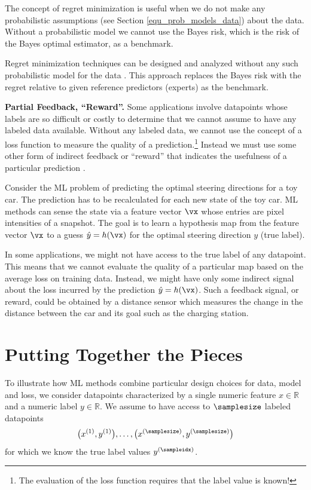 \documentclass[12pt]{report}
\begin{document}
The concept of regret minimization is useful when we do 
not make any probabilistic assumptions (see Section \ref{equ_prob_models_data}) 
about the data. Without a probabilistic model we cannot use 
the Bayes risk, which is the risk of the Bayes optimal estimator, 
as a benchmark. 

Regret minimization techniques can be designed and analyzed 
without any such probabilistic model for the data \cite{PredictionLearningGames}. 
This approach replaces the Bayes risk with the regret relative to 
given reference predictors (experts) as the benchmark. 

{\bf Partial Feedback, ``Reward''.}  
Some applications involve datapoints whose labels are so 
difficult or costly to determine that we cannot assume to 
have any labeled data available. Without any labeled data, 
we cannot use the concept of a loss function to measure the 
quality of a prediction.\footnote{The evaluation of the loss function 
requires that the label value is known!} Instead we must use 
some other form of indirect feedback or ``reward'' that indicates 
the usefulness of a particular prediction \cite{PredictionLearningGames,SuttonEd2}. 

Consider the ML problem of predicting the optimal steering 
directions for a toy car. The prediction has to be recalculated 
for each new state of the toy car. ML methods can sense the 
state via a feature vector $\vx$ whose entries are pixel intensities of a 
snapshot. The goal is to learn a hypothesis map from the feature vector 
$\vx$ to a guess $\hat{y} = h(\vx)$ for the optimal steering direction $y$ (true label). 

In some applications, we might not have access to the true label of any 
datapoint. This means that we cannot evaluate the quality of a particular 
map based on the average loss on training data. Instead, we might have 
only some indirect signal about the loss incurred by the prediction 
$\hat{y}=h(\vx)$. Such a feedback signal, or reward, could be obtained 
by a distance sensor which measures the change in the distance 
between the car and its goal such as the charging station. 

\section{Putting Together the Pieces} 
\label{sec_putting_togehter_the_pieces}

To illustrate how ML methods combine particular design choices for 
data, model and loss, we consider datapoints characterized by a single 
numeric feature $x \in \mathbb{R}$ and a numeric label $y \in \mathbb{R}$. 
We assume to have access to $\samplesize$ labeled datapoints 
\begin{equation} 
\big(x^{(1)},y^{(1)}\big),\ldots, \big(x^{(\samplesize)},y^{(\samplesize)}\big)  \label{equ_labeled_data_putting_together}
\end{equation} 
for which we know the true label values $y^{(\sampleidx)}$. 
\end{document}
